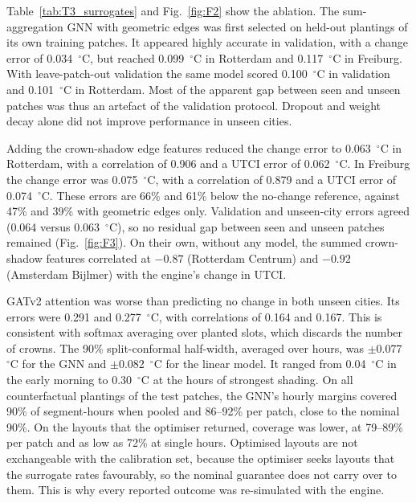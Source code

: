 \documentclass[preprint,12pt,authoryear]{elsarticle}
\newcommand{\degC}{\ensuremath{^\circ}C}
\begin{document}
Table~\ref{tab:T3_surrogates} and Fig.~\ref{fig:F2} show the ablation. The sum-aggregation GNN with geometric edges was first selected on held-out plantings of its own training patches. It appeared highly accurate in validation, with a change error of 0.034~\degC, but reached 0.099~\degC{} in Rotterdam and 0.117~\degC{} in Freiburg. With leave-patch-out validation the same model scored 0.100~\degC{} in validation and 0.101~\degC{} in Rotterdam. Most of the apparent gap between seen and unseen patches was thus an artefact of the validation protocol. Dropout and weight decay alone did not improve performance in unseen cities.

Adding the crown-shadow edge features reduced the change error to 0.063~\degC{} in Rotterdam, with a correlation of 0.906 and a UTCI error of 0.062~\degC. In Freiburg the change error was 0.075~\degC, with a correlation of 0.879 and a UTCI error of 0.074~\degC. These errors are 66\% and 61\% below the no-change reference, against 47\% and 39\% with geometric edges only. Validation and unseen-city errors agreed (0.064 versus 0.063~\degC), so no residual gap between seen and unseen patches remained (Fig.~\ref{fig:F3}). On their own, without any model, the summed crown-shadow features correlated at $-0.87$ (Rotterdam Centrum) and $-0.92$ (Amsterdam Bijlmer) with the engine's change in UTCI.

GATv2 attention was worse than predicting no change in both unseen cities. Its errors were 0.291 and 0.277~\degC, with correlations of 0.164 and 0.167. This is consistent with softmax averaging over planted slots, which discards the number of crowns. The 90\% split-conformal half-width, averaged over hours, was $\pm$0.077~\degC{} for the GNN and $\pm$0.082~\degC{} for the linear model. It ranged from 0.04~\degC{} in the early morning to 0.30~\degC{} at the hours of strongest shading. On all counterfactual plantings of the test patches, the GNN's hourly margins covered 90\% of segment-hours when pooled and 86--92\% per patch, close to the nominal 90\%. On the layouts that the optimiser returned, coverage was lower, at 79--89\% per patch and as low as 72\% at single hours. Optimised layouts are not exchangeable with the calibration set, because the optimiser seeks layouts that the surrogate rates favourably, so the nominal guarantee does not carry over to them. This is why every reported outcome was re-simulated with the engine.


\end{document}
